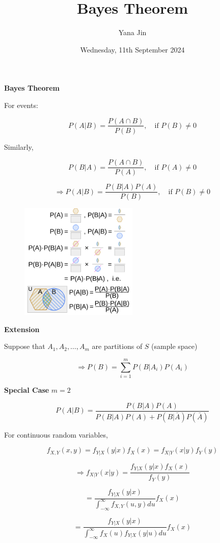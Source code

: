 \documentclass[14pt]{extarticle}
\title{Bayes Theorem}
\author{Yana Jin}
\date{Wednesday, 11th September 2024}
\begin{document}
\textbf{Bayes Theorem}

For events:

\[
  \displaystyle
  P(A|B) = \frac{P(A \cap B)}{P(B)}, \quad \text{if } P(B) \neq 0
\]

Similarly,

\[
  \displaystyle
  P(B|A) = \frac{P(A \cap B)}{P(A)}, \quad \text{if } P(A) \neq 0
\]

\[
  \displaystyle
  \Rightarrow P(A|B) = \frac{P(B|A) P(A)}{P(B)}, \quad \text{if } P(B) \neq 0
\]

\begin{figure}[h]
    \centering
    \includegraphics[width=0.5\textwidth]{fig1.png}
\end{figure}

\textbf{Extension}

Suppose that $A_1, A_2, \dots, A_m$ are partitions of $S$ (sample space)

\[
  \displaystyle
  \Rightarrow P(B) = \sum_{i=1}^{m} P(B|A_i) P(A_i)
\]

\textbf{Special Case} $m=2$

\[
  \displaystyle
  P(A|B) = \frac{P(B|A) P(A)}{P(B|A) P(A) + P(B|\bar{A}) P(\bar{A})}
\]

For continuous random variables,

\[
  \displaystyle
  f_{X,Y}(x,y) = f_{Y|X}(y|x) f_X(x) = f_{X|Y}(x|y) f_Y(y)
\]

\[
  \displaystyle
  \Rightarrow f_{X|Y}(x|y) = \frac{f_{Y|X}(y|x) f_X(x)}{f_Y(y)}
\]

\[
  \displaystyle
  = \frac{f_{Y|X}(y|x)}{\int_{-\infty}^{\infty} f_{X,Y}(u,y) du} f_X(x)
\]

\[
  \displaystyle
  = \frac{f_{Y|X}(y|x)}{\int_{-\infty}^{\infty} f_X(u) f_{Y|X}(y|u) du} f_X(x)
\]
\end{document}
